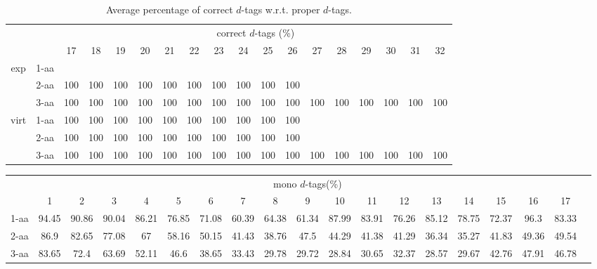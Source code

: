 \begin{table}[h]\tiny
\vspace{3mm}
{\centering
\begin{center}
\begin{tabular}{|c|l|c|c|c|c|c|c|c|c|c|c|c|c|c|c|c|c|}
  \hline
  \multicolumn{2}{|c|}{ } & \multicolumn{ 16 }{|c|}{ correct $d$-tags (\%)} \\
  \cline{3- 18}
  \multicolumn{2}{|c|}{ }  & 17 & 18 & 19 & 20 & 21 & 22 & 23 & 24 & 25 & 26 & 27 & 28 & 29 & 30 & 31 & 32\\
  \hline
  \multirow{3}{*}{exp}
&  1-aa  &  &  &  &  &  &  &  &  &  &  &  &  &  &  &  & \\
&  2-aa  & 100 & 100 & 100 & 100 & 100 & 100 & 100 & 100 & 100 & 100 &  &  &  &  &  & \\
&  3-aa  & 100 & 100 & 100 & 100 & 100 & 100 & 100 & 100 & 100 & 100 & 100 & 100 & 100 & 100 & 100 & 100\\
 \hline
  \multirow{3}{*}{virt} 
&  1-aa  & 100 & 100 & 100 & 100 & 100 & 100 & 100 & 100 & 100 & 100 &  &  &  &  &  & \\
&  2-aa  & 100 & 100 & 100 & 100 & 100 & 100 & 100 & 100 & 100 & 100 &  &  &  &  &  & \\
&  3-aa  & 100 & 100 & 100 & 100 & 100 & 100 & 100 & 100 & 100 & 100 & 100 & 100 & 100 & 100 & 100 & 100\\
 \hline
\end{tabular}
\end{center}
\par}
\centering

\caption{ Average percentage of correct $d$-tags w.r.t. proper $d$-tags.}

\vspace{3mm}
\label{table:correct-vs-proper-d-tags}
\end{table}
\begin{table}[h]\tiny
\vspace{3mm}
{\centering
\begin{center}
\begin{tabular}{|l|c|c|c|c|c|c|c|c|c|c|c|c|c|c|c|c|c|c|}
  \hline
  & \multicolumn{ 17 }{|c|}{mono $d$-tags(\%)} \\
  \cline{2- 18}
    & 1 & 2 & 3 & 4 & 5 & 6 & 7 & 8 & 9 & 10 & 11 & 12 & 13 & 14 & 15 & 16 & 17\\
  \hline
1-aa  & 94.45 & 90.86 & 90.04 & 86.21 & 76.85 & 71.08 & 60.39 & 64.38 & 61.34 & 87.99 & 83.91 & 76.26 & 85.12 & 78.75 & 72.37 & 96.3 & 83.33\\
2-aa  & 86.9 & 82.65 & 77.08 & 67 & 58.16 & 50.15 & 41.43 & 38.76 & 47.5 & 44.29 & 41.38 & 41.29 & 36.34 & 35.27 & 41.83 & 49.36 & 49.54\\
3-aa  & 83.65 & 72.4 & 63.69 & 52.11 & 46.6 & 38.65 & 33.43 & 29.78 & 29.72 & 28.84 & 30.65 & 32.37 & 28.57 & 29.67 & 42.76 & 47.91 & 46.78\\
 \hline
\end{tabular}
\end{center}
\par}
\centering

\vspace{3mm}
\label{table:mono-d-tags}
\end{table}
